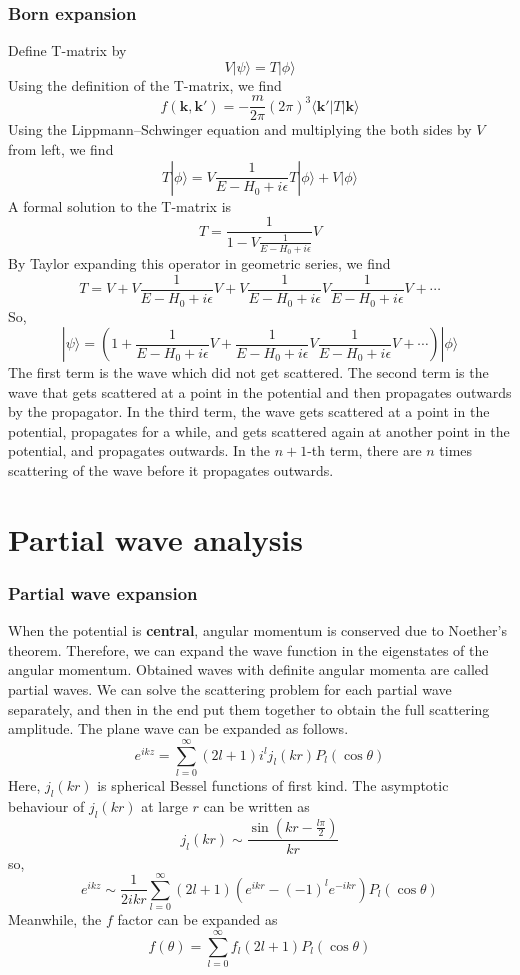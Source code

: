 \documentclass[cyan]{elegantnote}
\begin{document}
\subsubsection{Born expansion}
\noindent
Define T-matrix by
\[V | \psi \rangle = T |\phi\rangle\]
Using the definition of the T-matrix, we find
\[f(\mathbf{k},\mathbf{k}') = - \frac{m}{2\pi} (2\pi)^3  \langle \mathbf{k}'| T | \mathbf{k}\rangle \]
Using the Lippmann–Schwinger equation and multiplying the
both sides by $V$ from left, we find
\[ T |\phi\rangle = V \frac{1}{E-H_0 + i\epsilon}T|\phi\rangle + V|\phi\rangle\]
A formal solution to the T-matrix is
\[T = \frac{1}{1-V\frac{1}{E-H_0 + i\epsilon}}V\]
By Taylor expanding this operator in geometric series, we find
\[T = V + V \frac{1}{E-H_0 + i\epsilon} V + V \frac{1}{E-H_0 + i\epsilon} V \frac{1}{E-H_0 + i\epsilon} V + \cdots\]
So,
\[|\psi\rangle = \left( 1 +  \frac{1}{E-H_0 + i\epsilon} V +  \frac{1}{E-H_0 + i\epsilon} V \frac{1}{E-H_0 + i\epsilon} V + \cdots \right) | \phi \rangle\]
The first term is the wave which did not get scattered.
The second term is the wave that gets scattered at a point in the potential and then propagates outwards by the propagator. 
In the third term, the wave gets scattered at a point in the potential, propagates for a while, and gets scattered again at another point in the potential, and propagates outwards. 
In the $n+1$-th term, there are $n$ times scattering of the wave before it propagates outwards.

\section{Partial wave analysis}
\subsubsection{Partial wave expansion}
When the potential is \textbf{central}, angular momentum is conserved due to Noether's theorem. Therefore, we can expand the wave function in the eigenstates of the angular momentum. Obtained waves with definite angular momenta are called partial waves. We can solve the scattering problem for each partial wave separately, and then in the end put them together to obtain the full scattering amplitude.
The plane wave can be expanded as follows.
\[e^{ikz} = \sum_{l=0}^{\infty}(2l+1)i^l j_l(kr) P_l(\cos \theta)\]
Here, $j_l(kr)$ is spherical Bessel functions of first kind. The asymptotic behaviour of $j_l(kr)$ at large $r$ can be written as
\[j_l(kr) \sim \frac{\sin(kr-\frac{l\pi}{2})}{kr}\]
so,
\[e^{ikz} \sim \frac{1}{2ikr} \sum_{l=0}^{\infty} (2l+1) (e^{ikr} - (-1)^l e^{-ikr})P_l(\cos \theta)\]
Meanwhile, the $f$ factor can be expanded as
\[f(\theta) = \sum_{l=0}^{\infty} f_l (2l+1)P_l(\cos \theta)\]
\end{document}
